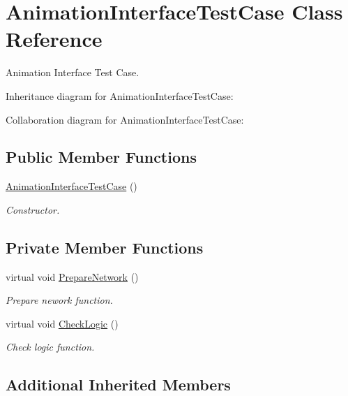 \hypertarget{classAnimationInterfaceTestCase}{}\section{Animation\+Interface\+Test\+Case Class Reference}
\label{classAnimationInterfaceTestCase}


Animation Interface Test Case.  




Inheritance diagram for Animation\+Interface\+Test\+Case\+:


Collaboration diagram for Animation\+Interface\+Test\+Case\+:
\subsection*{Public Member Functions}
\begin{DoxyCompactItemize}
\item 
\hyperlink{classAnimationInterfaceTestCase_a29de6970cb27dea1e5a016d50d0efaae}{Animation\+Interface\+Test\+Case} ()
\begin{DoxyCompactList}\small\item\em Constructor. \end{DoxyCompactList}\end{DoxyCompactItemize}
\subsection*{Private Member Functions}
\begin{DoxyCompactItemize}
\item 
virtual void \hyperlink{classAnimationInterfaceTestCase_ae48a9d693e0e93f265ea2c27b985f462}{Prepare\+Network} ()
\begin{DoxyCompactList}\small\item\em Prepare nework function. \end{DoxyCompactList}\item 
virtual void \hyperlink{classAnimationInterfaceTestCase_a53ef1b8d8aa4cce9b1138a31d8ff51fa}{Check\+Logic} ()
\begin{DoxyCompactList}\small\item\em Check logic function. \end{DoxyCompactList}\end{DoxyCompactItemize}
\subsection*{Additional Inherited Members}


